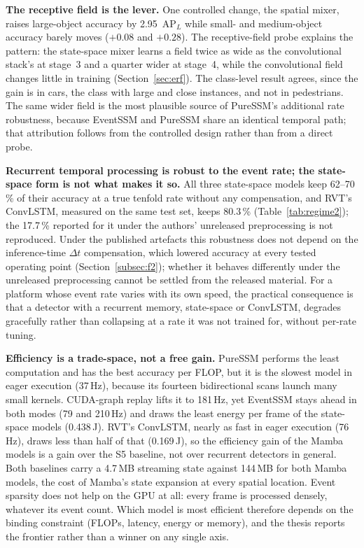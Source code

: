 \documentclass[11pt, a4paper]{report}
\begin{document}
\textbf{The receptive field is the lever.} One controlled change, the spatial mixer, raises large-object
accuracy by 2.95~$\mathrm{AP}_L$ while small- and medium-object accuracy barely moves ($+0.08$ and
$+0.28$). The receptive-field probe explains the pattern: the state-space mixer learns a field twice as
wide as the convolutional stack's at stage~3 and a quarter wider at stage~4, while the convolutional
field changes little in training (Section~\ref{sec:erf}). The class-level result agrees, since the gain
is in cars, the class with large and close instances, and not in pedestrians. The same wider field is
the most plausible source of PureSSM's additional rate robustness, because EventSSM and PureSSM share an
identical temporal path; that attribution follows from the controlled design rather than from a direct
probe.

\textbf{Recurrent temporal processing is robust to the event rate; the state-space form is not what
makes it so.} All three state-space models keep 62--70\,\% of their accuracy at a true tenfold rate
without any compensation, and RVT's ConvLSTM, measured on the same test set, keeps 80.3\,\%
(Table~\ref{tab:regime2}); the 17.7\,\% reported for it under the authors' unreleased preprocessing is not
reproduced. Under the published artefacts this robustness does
not depend on the inference-time $\Delta t$ compensation, which lowered accuracy at every tested
operating point (Section~\ref{subsec:f2}); whether it behaves differently under the unreleased
preprocessing cannot be settled from the released material. For a platform whose event rate varies with
its own speed, the practical consequence is that a detector with a recurrent memory, state-space or
ConvLSTM, degrades gracefully rather than collapsing at a rate it was not trained for, without per-rate
tuning.

\textbf{Efficiency is a trade-space, not a free gain.} PureSSM performs the least computation and has
the best accuracy per FLOP, but it is the slowest model in eager execution (37\,Hz), because its
fourteen bidirectional scans launch many small kernels. CUDA-graph replay lifts it to 181\,Hz, yet
EventSSM stays ahead in both modes (79 and 210\,Hz) and draws the least energy per frame of the
state-space models (0.438\,J). RVT's ConvLSTM, nearly as fast in eager execution (76\,Hz), draws less than
half of that (0.169\,J), so the efficiency gain of the Mamba models is a gain over the S5 baseline, not over
recurrent detectors in general. Both baselines carry a 4.7\,MB streaming state against 144\,MB for both
Mamba models, the cost of Mamba's state expansion at every spatial location. Event sparsity does not help on the GPU at all: every frame
is processed densely, whatever its event count. Which model is most efficient therefore depends on the
binding constraint (FLOPs, latency, energy or memory), and the thesis reports the frontier rather than
a winner on any single axis.
\end{document}
